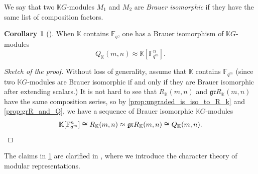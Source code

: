 \documentclass[12pt,a4paper]{report}
\theoremstyle{definition}
\newtheorem{corollary}{Corollary}[theorem]
\theoremstyle{remark}
\theoremstyle{definition}
\begin{document}
We say that two $\mathbb{K}G$-modules $M_1$ and $M_2$ are \emph{Brauer isomorphic} if they have the same list of composition factors.
\begin{corollary}[{\cite[Corollary 6.11]{Lewis_Reiner_Stanton_2017}}]\label{cor:brauer_iso}
    When $\mathbb{K}$ contains $\mathbb{F}_q$, one has a Brauer isomorphism of $\mathbb{K}G$-modules
    \begin{equation*}
        Q_{\mathbb{K}}(m, n) \approx \mathbb{K}[\mathbb{F}_{q^m}^{n}].
    \end{equation*}
\end{corollary}
\begin{proof}[Sketch of the proof]
    Without loss of generality, assume that $\mathbb{K}$ contains $\mathbb{F}_{q^m}$ (since two $\mathbb{K}G$-modules are Brauer isomorphic if and only if they are Brauer isomorphic after extending scalars.) It is not hard to see that $R_{\mathbb{K}}(m, n)$ and $\mathfrak{gr}R_{\mathbb{K}}(m, n)$ have the same composition series, so by \cref{prop:ungraded_is_iso_to_R_k} and \cref{prop:grR_and_Q}, we have a sequence of Brauer isomorphic $\mathbb{K}G$-modules
    \begin{equation*}
        \mathbb{K}[\mathbb{F}_{q^m}^{n}]\cong R_{\mathbb{K}}(m, n) \approx \mathfrak{gr}R_{\mathbb{K}}(m, n) \cong Q_{\mathbb{K}}(m, n).\qedhere
    \end{equation*}
\end{proof}
The claims in \cref{cor:brauer_iso} are clarified in , where we introduce the character theory of modular representations.
\end{document}
